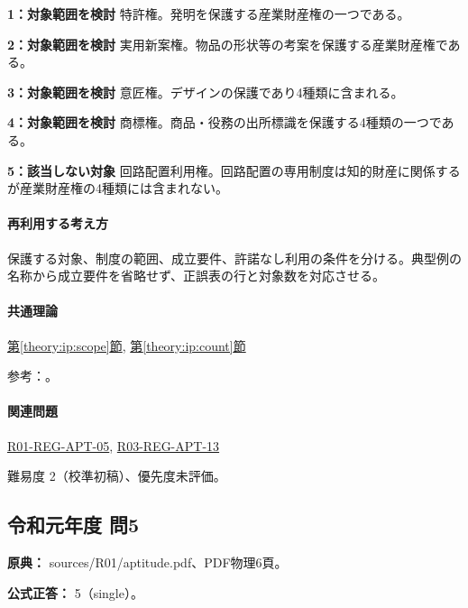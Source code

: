 \noindent\textbf{1：対象範囲を検討} 特許権。発明を保護する産業財産権の一つである。\par

\noindent\textbf{2：対象範囲を検討} 実用新案権。物品の形状等の考案を保護する産業財産権である。\par

\noindent\textbf{3：対象範囲を検討} 意匠権。デザインの保護であり4種類に含まれる。\par

\noindent\textbf{4：対象範囲を検討} 商標権。商品・役務の出所標識を保護する4種類の一つである。\par

\noindent\textbf{5：該当しない対象} 回路配置利用権。回路配置の専用制度は知的財産に関係するが産業財産権の4種類には含まれない。\par

\paragraph{再利用する考え方} 保護する対象、制度の範囲、成立要件、許諾なし利用の条件を分ける。典型例の名称から成立要件を省略せず、正誤表の行と対象数を対応させる。

\paragraph{共通理論} \hyperref[theory:ip:scope]{第\ref*{theory:ip:scope}節}, \hyperref[theory:ip:count]{第\ref*{theory:ip:count}節}

\par 参考：\cite{ip_industrial_four,ip_broad_scope}。

\paragraph{関連問題} \hyperref[q:r01-reg-apt-05]{R01-REG-APT-05}, \hyperref[q:r03-reg-apt-13]{R03-REG-APT-13}

\par 難易度 2（校準初稿）、優先度未評価。

\subsection{令和元年度 問5}
\label{q:r01-reg-apt-05}

\noindent\textbf{原典：} sources/R01/aptitude.pdf、PDF物理6頁。

\textbf{公式正答：} 5（single）。

